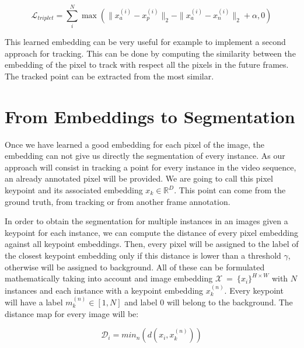 \begin{equation}
  \label{eq:tripletloss:2}
  \mathcal{L}_{triplet} =
	\sum_i^N \max \left(
		\|x_a^{(i)} - x_p^{(i)}\|_2 - \|x_a^{(i)} - x_n^{(i)}\|_2  + \alpha,
		0 \right)
\end{equation}

This learned embedding can be very useful for example to implement a second approach for tracking.
This can be done by computing the similarity between the embedding of the pixel to track with respect all the pixels in the future frames.
The tracked point can be extracted from the most similar.



\section{From Embeddings to Segmentation}
\label{sec:methods:embeddingsegmentation}

Once we have learned a good embedding for each pixel of the image, the embedding can not give us directly the segmentation of every instance.
As our approach will consist in tracking a point for every instance in the video sequence, an already annotated pixel will be provided.
We are going to call this pixel keypoint and its associated embedding $x_k \in \mathbb{R}^D$.
This point can come from the ground truth, from tracking or from another frame annotation.

In order to obtain the segmentation for multiple instances in an images given a keypoint for each instance, we can compute the distance of every pixel embedding against all keypoint embeddings.
Then, every pixel will be assigned to the label of the closest keypoint embedding only if this distance is lower than a threshold $\gamma$, otherwise will be assigned to background.
All of these can be formulated mathematically taking into account and image embedding $\mathcal{X}~=~\{x_i\}^{H \times W}$ with $N$ instances and each instance with a keypoint embedding $x_k^{(n)}$.
Every keypoint will have a label $m_k^{(n)} \in [1, N]$ and label $0$ will belong to the background.
The distance map for every image will be:

\begin{equation}
  \mathcal{D}_i = min_n \left( d(x_i, x_k^{(n)}) \right)
\end{equation}

